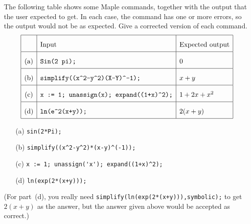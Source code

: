 \documentclass[a4paper]{article}
\begin{document}
\begin{problem}\label{ex-error-i}
 The following table shows some Maple commands, together
 with the output that the user expected to get.  In each
 case, the command has one or more errors, so the output
 would not be as expected.  Give a corrected version of each
 command.  
 \[ \renewcommand{\arraystretch}{2}
    \begin{array}{|c|l|l|}
     \hline
      & \text{Input} & \text{Expected output} \\ \hline
      \text{(a)} &
      \verb~Sin(2 pi);~ &
      0 \\ \hline
      \text{(b)} &
      \verb~simplify((x^2-y^2)(X-Y)^-1);~ &
      x+y \\ \hline
      \text{(c)} &
      \verb~x := 1; unassign(x); expand((1+x)^2);~ &
      1 + 2x + x^2 \\ \hline
      \text{(d)} &
      \verb~ln(e^2(x+y));~ &
      2(x+y) \\ \hline
    \end{array}
 \]
\end{problem}
\begin{solution}
 \begin{itemize}
  \item[(a)] \verb~sin(2*Pi);~  \hspace{2em}
  \item[(b)] \verb~simplify((x^2-y^2)*(x-y)^(-1));~ \hspace{2em}
  \item[(c)] \verb~x := 1; unassign('x'); expand((1+x)^2);~ \hspace{2em}
  \item[(d)] \verb~ln(exp(2*(x+y)));~ \hspace{2em}
 \end{itemize}
 (For part~(d), you really need
 \verb~simplify(ln(exp(2*(x+y))),symbolic);~ to get $2(x+y)$
 as the answer, but the answer given above would be accepted
 as correct.)
\end{solution}
\end{document}
